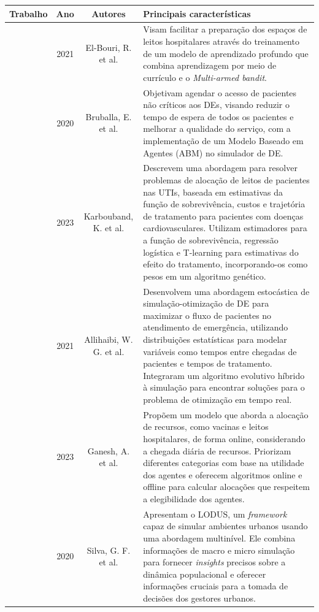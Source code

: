 \begin{longtable}{ |c|c|c|p{8.5cm}| } 
 \hline
 Trabalho & Ano & Autores & Principais características \\ 
 \hline
 ~\cite{9103941} & 2021 & El-Bouri, R. et al. & Visam facilitar a preparação dos espaços de leitos hospitalares através do treinamento de um modelo de aprendizado profundo que combina aprendizagem por meio de currículo e o \textit{Multi-armed bandit}.\\
 \hline
 ~\cite{8945359} & 2020 & Bruballa, E. et al. & Objetivam agendar o acesso de pacientes não críticos aos DEs, visando reduzir o tempo de espera de todos os pacientes e melhorar a qualidade do serviço, com a implementação de um Modelo Baseado em Agentes (ABM) no simulador de DE.\\
 \hline
 ~\cite{10078258} & 2023 & Karbouband, K. et al. & Descrevem uma abordagem para resolver problemas de alocação de leitos de pacientes nas UTIs, baseada em estimativas da função de sobrevivência, custos e trajetória de tratamento para pacientes com doenças cardiovasculares. Utilizam estimadores para a função de sobrevivência, regressão logística e T-learning para estimativas do efeito do tratamento, incorporando-os como pesos em um algoritmo genético.\\
 \hline
 ~\cite{9481128} & 2021 & Allihaibi, W. G. et al. & Desenvolvem uma abordagem estocástica de simulação-otimização de DE para maximizar o fluxo de pacientes no atendimento de emergência, utilizando distribuições estatísticas para modelar variáveis como tempos entre chegadas de pacientes e tempos de tratamento. Integraram um algoritmo evolutivo híbrido à simulação para encontrar soluções para o problema de otimização em tempo real.\\
 \hline
 ~\cite{ganesh2023fair} & 2023 & Ganesh, A. et al. & Propõem um modelo que aborda a alocação de recursos, como vacinas e leitos hospitalares, de forma online, considerando a chegada diária de recursos. Priorizam diferentes categorias com base na utilidade dos agentes e oferecem algoritmos online e offline para calcular alocações que respeitem a elegibilidade dos agentes.\\
 \hline
 ~\cite{9239083} & 2020 & Silva, G. F. et al. & Apresentam o LODUS, um \textit{framework} capaz de simular ambientes urbanos usando uma abordagem multinível. Ele combina informações de macro e micro simulação para fornecer \textit{insights} precisos sobre a dinâmica populacional e oferecer informações cruciais para a tomada de decisões dos gestores urbanos.\\

\end{longtable}
